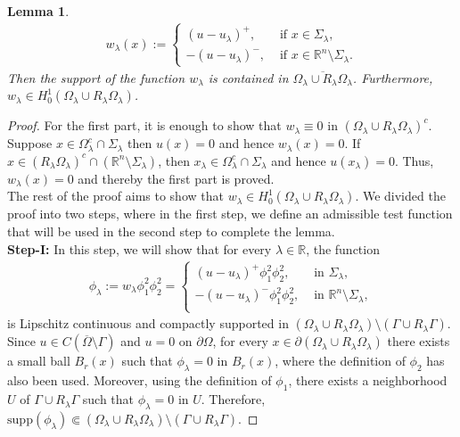 \documentclass[11pt, notitlepage]{article}
\def\R{\mathbb{R}}
\newtheorem{Lemma}[Theorem]{Lemma}
\begin{document}
{\begin{Lemma}
    \begin{align}\label{IF}
        w_\lambda(x):=\begin{cases}
    (u-u_\lambda)^+, &\text{ if }x\in\Sigma_\lambda,\\
    -(u-u_\lambda)^-,&\text{ if }x\in \R^n\setminus\Sigma_\lambda.
\end{cases}
    \end{align}
Then the support of the function $w_\lambda$ is contained in $\overline{\Omega_\lambda\cup R_\lambda\Omega_\lambda}$. Furthermore, $w_\lambda\in H^1_0(\Omega_\lambda\cup R_\lambda\Omega_\lambda)$.
\end{Lemma}
\begin{proof} For the first part, it is enough to show that $w_\lambda\equiv 0$ in $(\Omega_\lambda\cup R_\lambda\Omega_\lambda)^c$. Suppose $x\in \Omega_\lambda^c\cap\Sigma_\lambda$ then $u(x)=0$ and hence $w_\lambda(x)=0$. If $x\in (R_\lambda\Omega_\lambda)^c\cap (\R^n\setminus\Sigma_\lambda)$, then $x_\lambda\in \Omega_\lambda^c \cap \Sigma_\lambda$ and hence $u(x_\lambda)=0$. Thus, $w_\lambda(x)=0$ and thereby the first part is proved. \\
The rest of the proof aims to show that $w_\lambda\in H^1_0(\Omega_\lambda\cup R_\lambda\Omega_\lambda)$. We divided the proof into two steps, where in the first step, we define an admissible test function that will be used in the second step to complete the lemma.\\
\textbf{Step-I:} In this step, we will show that for every $\lambda\in\R$, the function
\begin{align*}
    \phi_\lambda:=w_\lambda\phi_1^2\phi_2^2 =\begin{cases}
        (u-u_\lambda)^+\phi_1^2\phi_2^2, &\text{ in }\Sigma_\lambda,\\
        -(u-u_\lambda)^-\phi_1^2\phi_2^2, &\text{ in }\R^n\setminus\Sigma_\lambda,\\
    \end{cases}
\end{align*}
is Lipschitz continuous and compactly supported in $(\Omega_\lambda\cup R_\lambda\Omega_\lambda)\setminus (\Gamma\cup R_\lambda\Gamma)$. 
Since $u\in C(\overline{\Omega}\setminus\Gamma)$ and $u=0$ on $\partial\Omega$, for every $x\in\partial(\Omega_\lambda\cup R_\lambda\Omega_\lambda)$ there exists a small ball $B_r(x)$ such that $\phi_\lambda=0$ in $B_r(x)$, where the definition of $\phi_2$ has also been used. Moreover, using the definition of $\phi_1$, there exists a neighborhood $U$ of $\Gamma\cup R_\lambda\Gamma$ such that $\phi_\lambda=0$ in $U$. Therefore, $\mathrm{supp}(\phi_\lambda)\Subset (\Omega_\lambda\cup R_\lambda\Omega_\lambda)\setminus (\Gamma\cup R_\lambda\Gamma)$.


\end{proof}}
\end{document}
